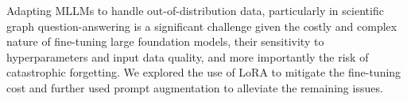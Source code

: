 \documentclass{article}
\begin{document}

Adapting MLLMs to handle out-of-distribution data, particularly in scientific graph question-answering is a significant challenge given the costly and complex nature of fine-tuning large foundation models, their sensitivity to hyperparameters and input data quality, and more importantly the risk of catastrophic forgetting. We explored the use of LoRA to mitigate the fine-tuning cost and further used prompt augmentation to alleviate the remaining issues.
\end{document}
